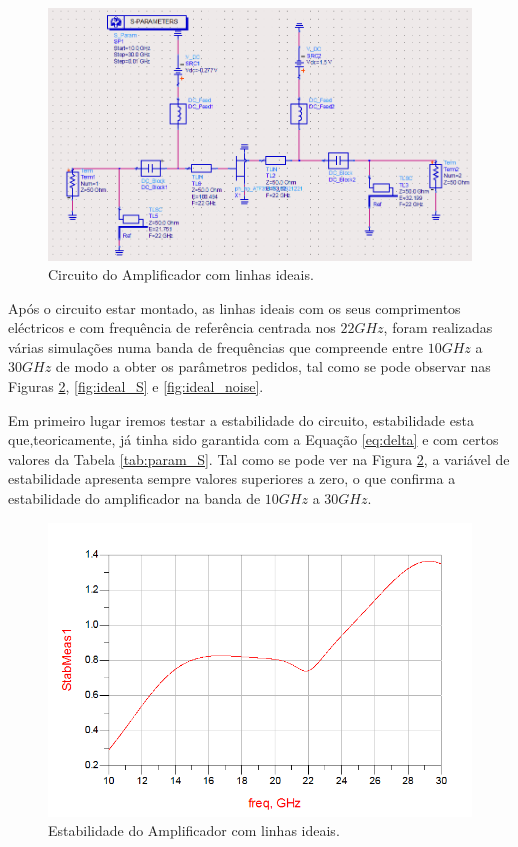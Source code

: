 \documentclass[11pt]{article}
\numberwithin{equation}{section}
\begin{document}
\begin{figure}[H]
	\centering
	\includegraphics[keepaspectratio=true, scale=0.45]{exps/Circuito_ideal}
	\vspace{-0.5em}
	\caption{Circuito do Amplificador com linhas ideais.}
	\vspace{-0.8em}
	\label{fig:circ_ideal}
\end{figure}
 
Após o circuito estar montado, as linhas ideais com os seus comprimentos eléctricos e com frequência de referência centrada nos $ 22 GHz $, foram realizadas várias simulações numa banda de frequências que compreende entre $ 10 GHz $ a $ 30GHz $ de modo a obter os parâmetros pedidos, tal como se pode observar nas Figuras \ref{fig:ideal_estavel}, \ref{fig:ideal_S} e \ref{fig:ideal_noise}.

Em primeiro lugar iremos testar a estabilidade do circuito, estabilidade esta que,teoricamente, já tinha sido garantida com a Equação \ref{eq:delta} e com certos valores da Tabela \ref{tab:param_S}. Tal como se pode ver na Figura \ref{fig:ideal_estavel}, a variável de estabilidade apresenta sempre valores superiores a zero, o que confirma a estabilidade do amplificador na banda de $ 10 GHz $ a $ 30GHz $.

\begin{figure}[H]
	\centering
	\includegraphics[keepaspectratio=true, scale=0.45]{exps/Ideal_estab}
	\vspace{-0.5em}
	\caption{Estabilidade do Amplificador com linhas ideais.}
	\vspace{-0.8em}
	\label{fig:ideal_estavel}
\end{figure}
\end{document}
